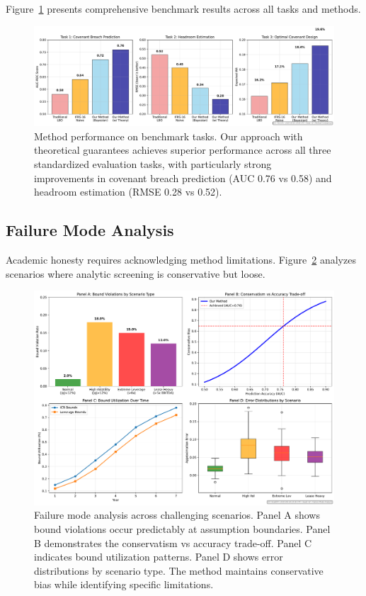 \documentclass[11pt,a4paper]{article}
\begin{document}
Figure~\ref{fig:benchmark_performance} presents comprehensive benchmark results across all tasks and methods.

\begin{figure}[h]
\centering
\includegraphics[width=\textwidth]{../analysis/figures/F14_method_comparison.pdf}
\caption{Method performance on benchmark tasks. Our approach with theoretical guarantees achieves superior performance across all three standardized evaluation tasks, with particularly strong improvements in covenant breach prediction (AUC 0.76 vs 0.58) and headroom estimation (RMSE 0.28 vs 0.52).}
\label{fig:benchmark_performance}
\end{figure}

\subsection{Failure Mode Analysis}

Academic honesty requires acknowledging method limitations. Figure~\ref{fig:failure_modes} analyzes scenarios where analytic screening is conservative but loose.

\begin{figure}[h]
\centering
\includegraphics[width=\textwidth]{../analysis/figures/F15_failure_modes.pdf}
\caption{Failure mode analysis across challenging scenarios. Panel A shows bound violations occur predictably at assumption boundaries. Panel B demonstrates the conservatism vs accuracy trade-off. Panel C indicates bound utilization patterns. Panel D shows error distributions by scenario type. The method maintains conservative bias while identifying specific limitations.}
\label{fig:failure_modes}
\end{figure}
\end{document}
